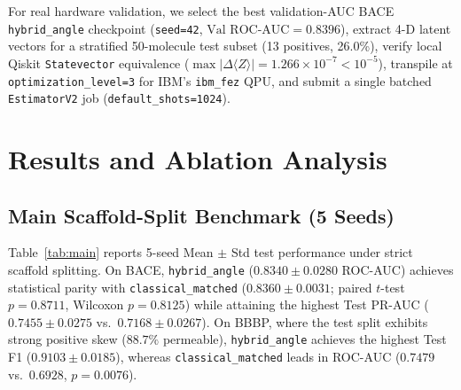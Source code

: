 \documentclass[conference]{IEEEtran}
\begin{document}
For real hardware validation, we select the best validation-AUC BACE \texttt{hybrid\_angle} checkpoint (\texttt{seed=42}, $\text{Val ROC-AUC}=0.8396$), extract 4-D latent vectors for a stratified 50-molecule test subset (13 positives, 26.0\%), verify local Qiskit \texttt{Statevector} equivalence ($\max |\Delta \langle Z\rangle| = 1.266 \times 10^{-7} < 10^{-5}$), transpile at \texttt{optimization\_level=3} for IBM's \texttt{ibm\_fez} QPU, and submit a single batched \texttt{EstimatorV2} job (\texttt{default\_shots=1024}).

\section{Results and Ablation Analysis}
\subsection{Main Scaffold-Split Benchmark (5 Seeds)}
Table~\ref{tab:main} reports 5-seed Mean $\pm$ Std test performance under strict scaffold splitting. On BACE, \texttt{hybrid\_angle} ($0.8340 \pm 0.0280$ ROC-AUC) achieves statistical parity with \texttt{classical\_matched} ($0.8360 \pm 0.0031$; paired $t$-test $p=0.8711$, Wilcoxon $p=0.8125$) while attaining the highest Test PR-AUC ($0.7455 \pm 0.0275$ vs.\ $0.7168 \pm 0.0267$). On BBBP, where the test split exhibits strong positive skew ($88.7\%$ permeable), \texttt{hybrid\_angle} achieves the highest Test F1 ($0.9103 \pm 0.0185$), whereas \texttt{classical\_matched} leads in ROC-AUC ($0.7479$ vs.\ $0.6928$, $p=0.0076$).
\end{document}

